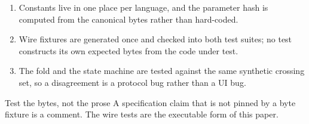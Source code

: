 \begin{enumerate}[leftmargin=1.6em,itemsep=0.25em]
  \item Constants live in one place per language, and the parameter hash is
        computed from the canonical bytes rather than hard-coded.
  \item Wire fixtures are generated once and checked into both test suites;
        no test constructs its own expected bytes from the code under test.
  \item The fold and the state machine are tested against the same synthetic
        crossing set, so a disagreement is a protocol bug rather than a UI
        bug.
\end{enumerate}

\begin{invariant}{Test the bytes, not the prose}
A specification claim that is not pinned by a byte fixture is a comment.
The wire tests are the executable form of this paper.
\end{invariant}
